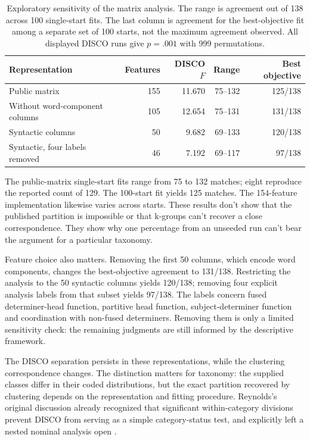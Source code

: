 \documentclass[12pt]{article}
\begin{document}
\begin{table}[tb]
\centering\small
\caption{Exploratory sensitivity of the matrix analysis. The range is agreement out of 138 across 100 single-start fits. The last column is agreement for the best-objective fit among a separate set of 100 starts, not the maximum agreement observed. All displayed DISCO runs give $p=.001$ with 999 permutations.}\label{tab:matrix}
\begin{tabular}{p{5.1cm}rrrr}
\toprule
Representation & Features & DISCO $F$ & Range & Best objective \\
\midrule
Public matrix & 155 & 11.670 & 75--132 & 125/138 \\
Without word-component columns & 105 & 12.654 & 75--131 & 131/138 \\
Syntactic columns & 50 & 9.682 & 69--133 & 120/138 \\
Syntactic, four labels removed & 46 & 7.192 & 69--117 & 97/138 \\

\bottomrule
\end{tabular}
\end{table}

The public-matrix single-start fits range from 75 to 132 matches; eight reproduce the reported count of 129. The 100-start fit yields 125 matches. The 154-feature implementation likewise varies across starts. These results don't show that the published partition is impossible or that k-groups can't recover a close correspondence. They show why one percentage from an unseeded run can't bear the argument for a particular taxonomy.

Feature choice also matters. Removing the first 50 columns, which encode word components, changes the best-objective agreement to 131/138. Restricting the analysis to the 50 syntactic columns yields 120/138; removing four explicit analysis labels from that subset yields 97/138. The labels concern fused determiner-head function, partitive head function, subject-determiner function and coordination with non-fused determiners. Removing them is only a limited sensitivity check: the remaining judgments are still informed by the descriptive framework.

The DISCO separation persists in these representations, while the clustering correspondence changes. The distinction matters for taxonomy: the supplied classes differ in their coded distributions, but the exact partition recovered by clustering depends on the representation and fitting procedure. Reynolds's original discussion already recognized that significant within-category divisions prevent DISCO from serving as a simple category-status test, and explicitly left a nested nominal analysis open \citep{reynolds2021}.
\end{document}
